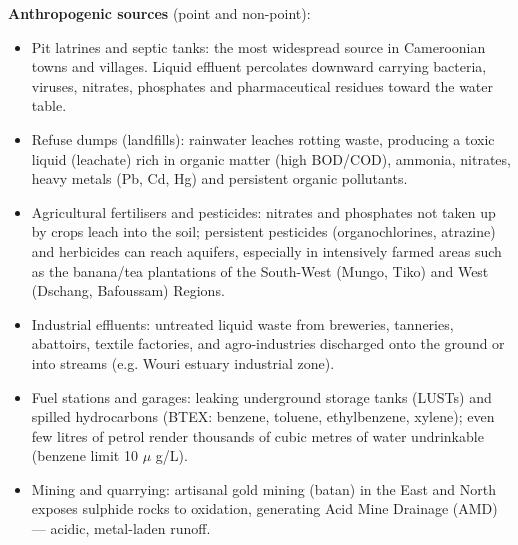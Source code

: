 \documentclass[11pt]{article}
\newcommand{\cle}[1]{{\popxbold\color{popdark}#1}}
\begin{document}
\textbf{Anthropogenic sources} (point and non-point):
\begin{itemize}
\item \cle{Pit latrines and septic tanks}: the most widespread source in Cameroonian towns and villages. Liquid effluent percolates downward carrying bacteria, viruses, nitrates, phosphates and pharmaceutical residues toward the water table.
\item \cle{Refuse dumps (landfills)}: rainwater leaches rotting waste, producing a toxic liquid (\cle{leachate}) rich in organic matter (high BOD/COD), ammonia, nitrates, heavy metals (Pb, Cd, Hg) and persistent organic pollutants.
\item \cle{Agricultural fertilisers and pesticides}: nitrates and phosphates not taken up by crops leach into the soil; persistent pesticides (organochlorines, atrazine) and herbicides can reach aquifers, especially in intensively farmed areas such as the banana/tea plantations of the South-West (Mungo, Tiko) and West (Dschang, Bafoussam) Regions.
\item \cle{Industrial effluents}: untreated liquid waste from breweries, tanneries, abattoirs, textile factories, and agro-industries discharged onto the ground or into streams (e.g. Wouri estuary industrial zone).
\item \cle{Fuel stations and garages}: leaking underground storage tanks (LUSTs) and spilled hydrocarbons (BTEX: benzene, toluene, ethylbenzene, xylene); even few litres of petrol render thousands of cubic metres of water undrinkable (benzene limit 10 $\mu$ g/L).
\item \cle{Mining and quarrying}: artisanal gold mining (batan) in the East and North exposes sulphide rocks to oxidation, generating Acid Mine Drainage (AMD) — acidic, metal-laden runoff.
\end{itemize}
\end{document}
